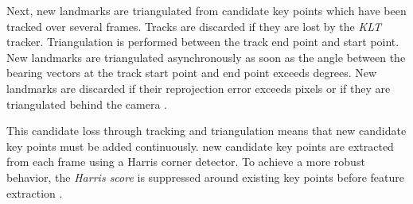 Next, new landmarks are triangulated from candidate key points which have been tracked over several frames. 
Tracks are discarded if they are lost by the \emph{KLT} tracker.
Triangulation is performed between the track end point and start point. 
New landmarks are triangulated asynchronously as soon as the angle between the bearing vectors at the track start point and end point exceeds \triangulationAngleThreshold degrees. 
New landmarks are discarded if their reprojection error exceeds \triangulationMaxReprError pixels or if they are triangulated behind the camera . \par 
This candidate loss through tracking and triangulation means that new candidate key points must be added continuously. 
\addCandidateEachFrame new candidate key points are extracted from each frame using a Harris corner detector. 
To achieve a more robust behavior, the \emph{Harris score} is suppressed around existing key points before feature extraction .